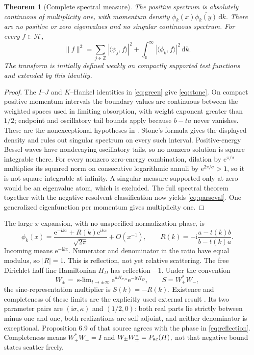\documentclass[10pt]{article}
\newcommand{\ii}{\mathrm i}
\newcommand{\e}{\mathrm e}
\newcommand{\dd}{\,\mathrm d}
\newcommand{\Z}{\mathbb Z}
\newtheorem{theorem}{Theorem}
\begin{document}
\begin{theorem}[Complete spectral measure]
The positive spectrum is absolutely continuous of multiplicity one, with
momentum density $\phi_k(x)\overline{\phi_k(y)}\dd k$.
There are no positive or zero eigenvalues and no singular continuous spectrum.
For every $f\in\mathcal H$,
\begin{equation}
 \|f\|^2=\sum_{j\in\Z}|\langle\psi_j,f\rangle|^2+
 \int_0^\infty|\langle\phi_k,f\rangle|^2\dd k.
 \label{eq:parseval}
\end{equation}
The transform is initially defined weakly on compactly supported test
functions and extended by this identity.
\end{theorem}
\begin{proof}
The $I$--$J$ and $K$--Hankel identities in \eqref{eq:green} give
\eqref{eq:stone}. On compact positive momentum intervals the boundary values
are continuous between the weighted spaces used in limiting absorption,
with weight exponent greater than $1/2$; endpoint and oscillatory tail
bounds apply because $b-ta$ never vanishes. These are the nonexceptional
hypotheses in \cite[Theorem 6.1 and Proposition 6.7]{dr2017}.
Stone's formula gives the displayed density and rules out singular spectrum
on every such interval. Positive-energy Bessel waves have nondecaying
oscillatory tails, so no nonzero solution is square integrable there.
For every nonzero zero-energy combination, dilation by $\e^{\pi/\sigma}$
multiplies its squared norm on consecutive logarithmic annuli by
$\e^{2\pi/\sigma}>1$, so it is not square integrable at infinity.
A singular measure supported only at zero would
be an eigenvalue atom, which is excluded. The full spectral theorem together
with the negative resolvent classification now yields \eqref{eq:parseval}.
One generalized eigenfunction per momentum gives multiplicity one.
\end{proof}

The large-$x$ expansion, with no unspecified normalization phase, is
\begin{equation}
 \phi_k(x)=\frac{\e^{-\ii kx}+R(k)\e^{\ii kx}}{\sqrt{2\pi}}+O(x^{-1}),
 \qquad R(k)=-\ii\frac{a-t(k)b}{b-t(k)a}.
 \label{eq:reflection}
\end{equation}
Incoming means $\e^{-\ii kx}$. Numerator and denominator in the ratio have
equal modulus, so $|R|=1$. This is reflection, not yet relative scattering.
The free Dirichlet half-line Hamiltonian $H_D$ has reflection $-1$.
Under the convention
\[
 W_\pm=\mathop{\mathrm{s-lim}}_{t\to\pm\infty}
 \e^{\ii tH_{\sigma,\kappa}}\e^{-\ii tH_D},\qquad S=W_+^*W_-,
\]
the sine-representation multiplier is $S(k)=-R(k)$.
Existence and completeness of these limits are the explicitly used external
result \cite[Proposition 6.10]{dr2017}. Its two parameter pairs are
$(\ii\sigma,\kappa)$ and $(1/2,0)$: both real parts lie strictly between
minus one and one, both realizations are self-adjoint, and neither denominator
is exceptional. Proposition 6.9 of that source agrees with the phase in
\eqref{eq:reflection}. Completeness means $W_\pm^*W_\pm=I$ and
$W_\pm W_\pm^*=P_{\rm ac}(H)$, not that negative bound states scatter freely.
\fi
\end{document}
